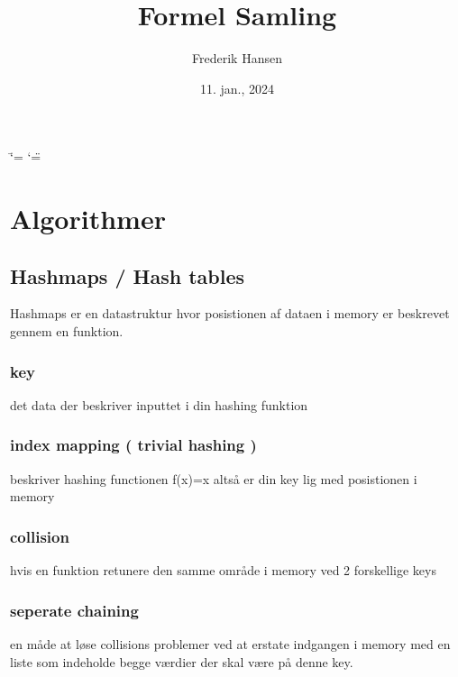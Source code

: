 \documentclass[letterpaper,10pt,danish]{sphinxmanual}
\title{Formel Samling}
\date{11. jan., 2024}
\author{Frederik Hansen}
\begin{document}
\ifdefined\shorthandoff
  \ifnum\catcode`\=\string=\active\shorthandoff{=}\fi
  \ifnum\catcode`\"=\active{}\fi
\fi

\pagestyle{empty}
\sphinxmaketitle
\pagestyle{plain}
\sphinxtableofcontents
\pagestyle{normal}
\label{\detokenize{index::doc}}


\sphinxstepscope


\chapter{Algorithmer}
\label{\detokenize{Algorithmer/index:algorithmer}}\label{\detokenize{Algorithmer/index::doc}}
\sphinxstepscope


\section{Hashmaps / Hash tables}
\label{\detokenize{Algorithmer/Hashmaps:hashmaps-hash-tables}}\label{\detokenize{Algorithmer/Hashmaps::doc}}
\sphinxAtStartPar
Hashmaps er en datastruktur hvor posistionen af dataen i memory er beskrevet gennem en funktion.


\subsection{key}
\label{\detokenize{Algorithmer/Hashmaps:key}}
\sphinxAtStartPar
det data der beskriver inputtet i din hashing funktion


\subsection{index mapping ( trivial hashing )}
\label{\detokenize{Algorithmer/Hashmaps:index-mapping-trivial-hashing}}
\sphinxAtStartPar
beskriver hashing functionen f(x)=x altså er din key lig med posistionen i memory


\subsection{collision}
\label{\detokenize{Algorithmer/Hashmaps:collision}}
\sphinxAtStartPar
hvis en funktion retunere den samme område i memory ved 2 forskellige keys


\subsection{seperate chaining}
\label{\detokenize{Algorithmer/Hashmaps:seperate-chaining}}
\sphinxAtStartPar
en måde at løse collisions problemer ved at erstate indgangen i memory med en liste som indeholde begge værdier der skal være på denne key.
\end{document}
